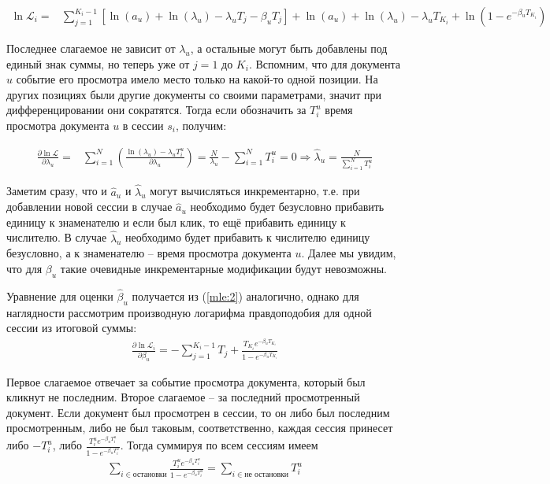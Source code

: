 \documentclass[diploma]{nanolab2015}
\begin{document}
\begin{align}
    \ln\mathcal{L}_i = & \sum_{j=1}^{K_i-1} \left[ \ln(a_u) + \ln(\lambda_u) - \lambda_u T_j - \beta_u T_j \right] + \ln(a_u) + \ln(\lambda_u) - \lambda_u T_{K_i} + \ln(1-e^{-\beta_u T_{K_i}})
\end{align}

Последнее слагаемое не зависит от $\lambda_u$, а остальные могут быть добавлены под единый знак суммы, но теперь уже от $j=1$ до $K_i$. Вспомним, что для документа $u$ событие его просмотра имело место только на какой-то одной позиции. На других позициях были другие документы со своими параметрами, значит при дифференцировании они сократятся. Тогда если обозначить за $T_i^u$ время просмотра документа $u$ в сессии $s_i$, получим: 

\begin{align}
    \frac{\partial \ln \mathcal{L}}{\partial \lambda_u} = & \sum_{i=1}^{N} \left( \frac{\ln(\lambda_u) - \lambda_u T_i^u}{\partial \lambda_u} \right) = \frac{N}{\lambda_u} - \sum_{i=1}^{N}T_i^u = 0 \Rightarrow \hat{\lambda}_u = \frac{N}{\sum_{i=1}^{N}T_i^u}
\end{align}

Заметим сразу, что и $\hat{a}_u$ и $\hat{\lambda}_u$ могут вычисляться инкрементарно, т.е. при добавлении новой сессии в случае $\hat{a}_u$ необходимо будет безусловно прибавить единицу к знаменателю и если был клик, то ещё прибавить единицу к числителю. В случае $\hat{\lambda}_u$ необходимо будет прибавить к числителю единицу безусловно, а к знаменателю -- время просмотра документа $u$. Далее мы увидим, что для $\beta_u$ такие очевидные инкрементарные модификации будут невозможны.

Уравнение для оценки $\hat{\beta}_u$ получается из (\ref{mle:2}) аналогично, однако для наглядности рассмотрим производную логарифма правдоподобия для одной сессии из итоговой суммы:
\begin{align}
    \frac{\partial \ln \mathcal{L}_i}{\partial \beta_u} = -\sum_{j=1}^{K_i-1} T_j + \frac{T_{K_i} e^{-\beta_u T_{K_i}}}{1 - e^{-\beta_u T_{K_i}}} \label{grad:1}   
\end{align}

Первое слагаемое отвечает за событие просмотра документа, который был кликнут не последним. Второе слагаемое -- за последний просмотренный документ. Если документ был просмотрен в сессии, то он либо был последним просмотренным, либо не был таковым, соответственно, каждая сессия принесет либо $-T_i^u$, либо $\frac{T_i^u e^{-\beta_u T_i^u}}{1 - e^{-\beta_u T_i^u}}$. Тогда суммируя по всем сессиям имеем
\begin{align}
    \sum_{i \in \text{остановки}}\frac{T_i^u e^{-\beta_u T_i^u}}{1 - e^{-\beta_u T_i^u}} = \sum_{i \in \text{не остановки}} T_i^u
\end{align}
\end{document}
